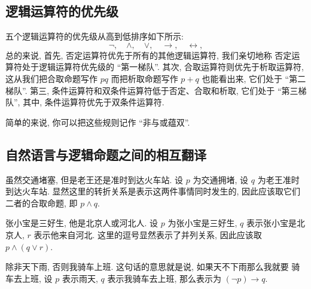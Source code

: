\documentclass[10pt,UTF8]{book} %
\begin{document}
\subsection{逻辑运算符的优先级}

五个逻辑运算符的优先级从高到低排序如下所示:
\[ \lnot, \quad \wedge, \quad \vee, \quad \to, \quad \leftrightarrow, \]
总的来说, 首先, {\kaishu 否定运算符优先于所有的其他逻辑运算符}, 我们亲切地称
否定运算符处于逻辑运算符优先级的 “第一梯队”. 其次, {\kaishu 合取运算符则优先于析取运算符},
这从我们把合取命题写作 $pq$ 而把析取命题写作 $p+q$ 也能看出来, 它们处于 “第二梯队”.
第三, 条件运算符和双条件运算符低于否定、合取和析取, 它们处于 “第三梯队”,
其中, {\kaishu 条件运算符优先于双条件运算符}.

简单的来说, 你可以把这些规则记作 “非与或蕴双”.

\subsection{自然语言与逻辑命题之间的相互翻译}


\begin{example}
    {\kaishu 虽然交通堵塞, 但是老王还是准时到达火车站}. 设 $p$ 为交通拥堵,
        设 $q$ 为老王准时到达火车站. 显然这里的转折关系是表示这两件事情同时发生的,
        因此应该取它们二者的合取命题, 即 $p \wedge q$.
\end{example}

\begin{example}
    {\kaishu 张小宝是三好生, 他是北京人或河北人}. 设 $p$ 为张小宝是三好生,
        $q$ 表示张小宝是北京人, $r$ 表示他来自河北. 这里的逗号显然表示了并列关系,
        因此应该取 $p \wedge (q \vee r)$.
\end{example}

\begin{example}
    {\kaishu 除非天下雨, 否则我骑车上班}. 这句话的意思就是说, 如果天不下雨那么我就要
        骑车去上班, 设 $p$ 表示雨天, $q$ 表示我骑车去上班, 那么表示为
        $(\lnot p) \rightarrow q$.
\end{example}
\end{document}
